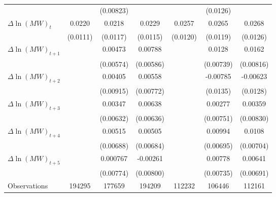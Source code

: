{\begin{tabular}{l*{6}{c}}
          &                  &(0.00823)         &                  &                  & (0.0126)         &                  \\
[1em]
$\Delta \ln(MW)_{t}$&   0.0220\sym{*}  &   0.0218\sym{*}  &   0.0229\sym{*}  &   0.0257\sym{**} &   0.0265\sym{**} &   0.0268\sym{**} \\
          & (0.0111)         & (0.0117)         & (0.0115)         & (0.0120)         & (0.0119)         & (0.0126)         \\
[1em]
$\Delta \ln(MW)_{t+1}$&                  &  0.00473         &  0.00788         &                  &   0.0128\sym{*}  &   0.0162\sym{*}  \\
          &                  &(0.00574)         &(0.00586)         &                  &(0.00739)         &(0.00816)         \\
[1em]
$\Delta \ln(MW)_{t+2}$&                  &  0.00405         &  0.00558         &                  & -0.00785         & -0.00623         \\
          &                  &(0.00915)         &(0.00772)         &                  & (0.0135)         & (0.0128)         \\
[1em]
$\Delta \ln(MW)_{t+3}$&                  &  0.00347         &  0.00638         &                  &  0.00277         &  0.00359         \\
          &                  &(0.00632)         &(0.00636)         &                  &(0.00751)         &(0.00830)         \\
[1em]
$\Delta \ln(MW)_{t+4}$&                  &  0.00515         &  0.00505         &                  &  0.00994         &   0.0108         \\
          &                  &(0.00688)         &(0.00684)         &                  &(0.00695)         &(0.00704)         \\
[1em]
$\Delta \ln(MW)_{t+5}$&                  & 0.000767         & -0.00261         &                  &  0.00778         &  0.00641         \\
          &                  &(0.00774)         &(0.00800)         &                  &(0.00735)         &(0.00691)         \\
\hline
Observations&   194295         &   177659         &   194209         &   112232         &   106446         &   112161         \\
\hline\hline
\end{tabular}
}
